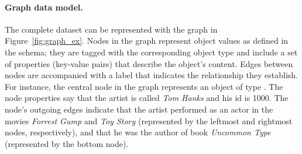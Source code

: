 
\paragraph{Graph data model.}

The complete \goodbois dataset can be represented with the graph in
Figure~\ref{fig:graph_ex}. Nodes in the graph represent object values
as defined in the schema; they are tagged with the corresponding
object type and include a set of properties (key-value pairs) that
describe the object's content. Edges between nodes are accompanied with
a label that indicates the relationship they establish. For instance,
the central node in the graph represents an object of type
\artist. The node properties say that the artist is called {\em Tom Hanks} and his id is 1000.
The node's outgoing edges indicate that the artist 
performed as an actor in the movies \emph{Forrest Gump} and \emph{Toy Story}
(represented by the leftmost and rightmost nodes, respectively), and
that he was the author of book \emph{Uncommon Type} (represented by the
bottom node).







